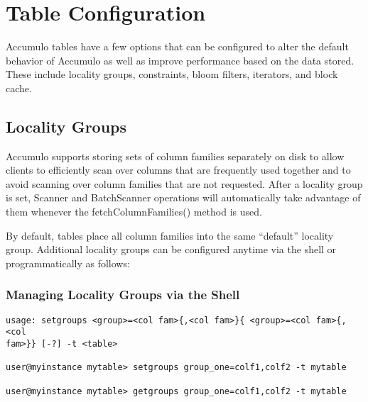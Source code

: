 
%
%

\chapter{Table Configuration}

Accumulo tables have a few options that can be configured to alter the default
behavior of Accumulo as well as improve performance based on the data stored.
These include locality groups, constraints, bloom filters, iterators, and block cache.

\section{Locality Groups}
Accumulo supports storing sets of column families separately on disk to allow
clients to efficiently scan over columns that are frequently used together and to avoid
scanning over column families that are not requested. After a locality group is set,
Scanner and BatchScanner operations will automatically take advantage of them
whenever the fetchColumnFamilies() method is used.

By default, tables place all column families into the same ``default'' locality group.
Additional locality groups can be configured anytime via the shell or
programmatically as follows:

\subsection{Managing Locality Groups via the Shell}

\small
\begin{verbatim}
usage: setgroups <group>=<col fam>{,<col fam>}{ <group>=<col fam>{,<col
fam>}} [-?] -t <table>

user@myinstance mytable> setgroups group_one=colf1,colf2 -t mytable

user@myinstance mytable> getgroups group_one=colf1,colf2 -t mytable
\end{verbatim}
\normalsize

